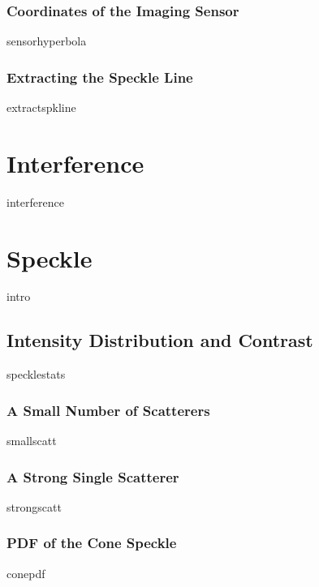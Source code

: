 \documentclass[12pt,a4paper,titlepage,onecolumn]{report}
\begin{document}
\subsection{Coordinates of the Imaging Sensor}
{sensorhyperbola}
\subsection{Extracting the Speckle Line}
{extractspkline}

\chapter{Interference} \label{ch:interference}
{interference}

\chapter{Speckle} \label{ch:speckle}
{intro}
\section{Intensity Distribution and Contrast}
{specklestats}
\subsection{A Small Number of Scatterers}
{smallscatt}
\subsection{A Strong Single Scatterer}
{strongscatt}
\subsection{PDF of the Cone Speckle}
{conepdf}
\end{document}
